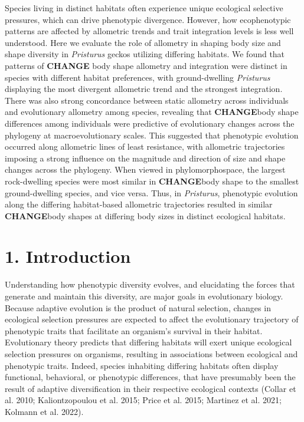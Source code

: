 \documentclass[
  11pt,
]{article}
\begin{document}
Species living in distinct habitats often experience unique ecological
selective pressures, which can drive phenotypic divergence. However, how
ecophenotypic patterns are affected by allometric trends and trait
integration levels is less well understood. Here we evaluate the role of
allometry in shaping body size and shape diversity in \emph{Pristurus}
geckos utilizing differing habitats. We found that patterns of
\textbf{CHANGE} body shape allometry and integration were distinct in
species with different habitat preferences, with ground-dwelling
\emph{Pristurus} displaying the most divergent allometric trend and the
strongest integration. There was also strong concordance between static
allometry across individuals and evolutionary allometry among species,
revealing that \textbf{CHANGE}body shape differences among individuals
were predictive of evolutionary changes across the phylogeny at
macroevolutionary scales. This suggested that phenotypic evolution
occurred along allometric lines of least resistance, with allometric
trajectories imposing a strong influence on the magnitude and direction
of size and shape changes across the phylogeny. When viewed in
phylomorphospace, the largest rock-dwelling species were most similar in
\textbf{CHANGE}body shape to the smallest ground-dwelling species, and
vice versa. Thus, in \emph{Pristurus}, phenotypic evolution along the
differing habitat-based allometric trajectories resulted in similar
\textbf{CHANGE}body shapes at differing body sizes in distinct
ecological habitats.

\newpage

\hypertarget{introduction}{%
\section{1. Introduction}\label{introduction}}

Understanding how phenotypic diversity evolves, and elucidating the
forces that generate and maintain this diversity, are major goals in
evolutionary biology. Because adaptive evolution is the product of
natural selection, changes in ecological selection pressures are
expected to affect the evolutionary trajectory of phenotypic traits that
facilitate an organism's survival in their habitat. Evolutionary theory
predicts that differing habitats will exert unique ecological selection
pressures on organisms, resulting in associations between ecological and
phenotypic traits. Indeed, species inhabiting differing habitats often
display functional, behavioral, or phenotypic differences, that have
presumably been the result of adaptive diversification in their
respective ecological contexts (Collar et al. 2010; Kaliontzopoulou et
al. 2015; Price et al. 2015; Martinez et al. 2021; Kolmann et al. 2022).
\hfill\break
\end{document}
